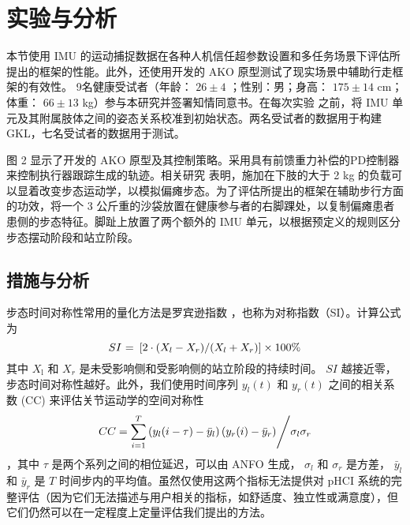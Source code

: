 \section{实验与分析  }    本节使用 IMU 的运动捕捉数据在各种人机信任超参数设置和多任务场景下评估所提出的框架的性能。此外，还使用开发的 AKO 原型测试了现实场景中辅助行走框架的有效性。 9名健康受试者（年龄：   $26\pm 4$   ；性别：男；身高：   $175\pm 14$    cm；体重：   $66\pm13$    kg）参与本研究并签署知情同意书。在每次实验    \cite{tongLSTMBasedLowerLimbs2020}    之前，将 IMU 单元及其附属肢体之间的姿态关系校准到初始状态。两名受试者的数据用于构建 GKL，七名受试者的数据用于测试。  

图 2 显示了开发的 AKO 原型及其控制策略。采用具有前馈重力补偿的PD控制器来控制执行器跟踪生成的轨迹。相关研究    \cite{zanottoAdaptiveAssistasneededController2014a}    表明，施加在下肢的大于 2 kg 的负载可以显着改变步态运动学，以模拟偏瘫步态。为了评估所提出的框架在辅助步行方面的功效，将一个 3 公斤重的沙袋放置在健康参与者的右脚踝处，以复制偏瘫患者患侧的步态特征。脚趾上放置了两个额外的 IMU 单元，以根据预定义的规则区分步态摆动阶段和站立阶段。


\subsection{措施与分析  }    步态时间对称性常用的量化方法是罗宾逊指数    \cite{viteckovaGaitSymmetryMeasures2018}    ，也称为对称指数（SI）。计算公式为
\begin{equation}
\label{deqn_ex21}
{SI}{\text{ = }}\left[ {{{2 \cdot \left( {{X_l} - {X_r}} \right)} \mathord{\left/
{\vphantom {{2 \cdot \left( {{X_l} - {X_r}} \right)} {\left( {{X_l} + {X_r}} \right)}}} \right.
\kern-\nulldelimiterspace} {\left( {{X_l} + {X_r}} \right)}}} \right] \times 100 \%  
\end{equation}    其中    ${X_{\text{l}}}$    和    ${X_r}$    是未受影响侧和受影响侧的站立阶段的持续时间。    $SI$    越接近零，步态时间对称性越好。此外，我们使用时间序列    ${y_l(t)}$    和    ${y_r(t)}$    之间的相关系数 (CC)    \cite{gouwandaIdentifyingGaitAsymmetry2011}    来评估关节运动学的空间对称性
\begin{equation}
\label{deqn_ex22}
CC = {{\sum\limits_{i = 1}^T {\left( {{y_l}(i - \tau) - {{\bar y}_l}} \right)} \left( {{y_r}(i ) - {{\bar y}_r}} \right)} \mathord{\left/
{\vphantom {{\sum\limits_{i = 1}^T {\left( {{y_l}(i) - {{\bar y}_l}} \right)}\left( {{y_r}(i + \tau ) - {{\bar y}_r}} \right)} {{\sigma _l}{\sigma _r}}}} \right.
\kern-\nulldelimiterspace} {{\sigma _l}{\sigma _r}}}
\end{equation}   ，其中    $\tau $    是两个系列之间的相位延迟，可以由 ANFO 生成，   ${\sigma _l}$    和    ${\sigma _r}$    是方差，   $\bar y_l$    和    $\bar y_r$    是    ${T}$    时间步内的平均值。虽然仅使用这两个指标无法提供对 pHCI 系统的完整评估（因为它们无法描述与用户相关的指标，如舒适度、独立性或满意度），但它们仍然可以在一定程度上定量评估我们提出的方法。  

